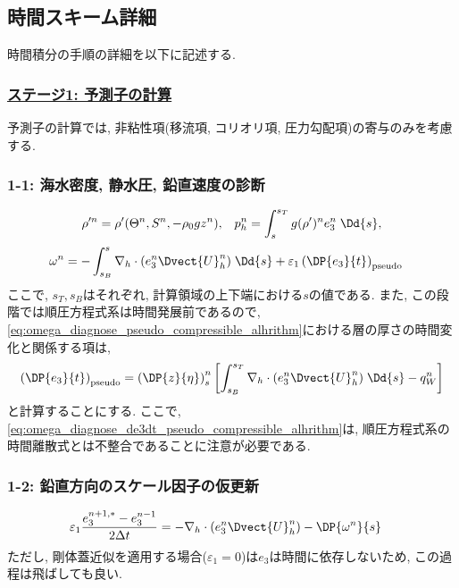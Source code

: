 \subsection{時間スキーム詳細}
時間積分の手順の詳細を以下に記述する.  

\subsubsection*{\underline{ステージ1: 予測子の計算}}
予測子の計算では, 非粘性項(移流項, コリオリ項, 圧力勾配項)の寄与のみを考慮する.

\subsubsection*{1-1: 海水密度, 静水圧, 鉛直速度の診断}
\vspace{-1cm}
\begin{align*}
 \rho'^n = \rho'(\Theta^n, S^n, - \rho_0 g z^n), \;\;\;  
 p_h^n = \int_s^{s_T} g (\rho')^n e_3^n \; \Dd{s}, 
\end{align*}
\begin{align}
 \omega^n 
  = 
    -& \int_{s_B}^s \nabla_h \cdot (e_3^n \Dvect{U}_h^n)  \;\Dd{s}
    + \varepsilon_1 \left(\DP{e_3}{t}\right)_{\rm pseudo}
\label{eq:omega_diagnose_pseudo_compressible_alhrithm}
\end{align}
ここで, $s_T, s_B$はそれぞれ, 計算領域の上下端における$s$の値である. 
また, この段階では順圧方程式系は時間発展前であるので, 
\eqref{eq:omega_diagnose_pseudo_compressible_alhrithm}における層の厚さの時間変化と関係する項は, 
\begin{align}
 \left(\DP{e_3}{t}\right)_{\rm pseudo}
  = \left(\DP{z}{\eta}\right)^n_s \left[ 
      \int_{s_B}^{s_T} \nabla_h \cdot (e_3^n \Dvect{U}_h^n) \;\Dd{s} 
      - q_W^n \right]
\label{eq:omega_diagnose_de3dt_pseudo_compressible_alhrithm}
\end{align}
と計算することにする.  
ここで,
\eqref{eq:omega_diagnose_de3dt_pseudo_compressible_alhrithm}は,
順圧方程式系の時間離散式とは不整合であることに注意が必要である.

\subsubsection*{1-2: 鉛直方向のスケール因子の仮更新}
\vspace{-1cm}
\begin{align}
 \varepsilon_1 \dfrac{e_3^{n+1,*} - e_3^{n-1}}{2\Delta t}
 = -& \nabla_h \cdot (e_3^n \Dvect{U}_h^n)
   - \DP{\omega^n}{s}
\end{align}
ただし, 剛体蓋近似を適用する場合($\varepsilon_1=0$)は$e_3$は時間に依存しないため, 
この過程は飛ばしても良い. 

